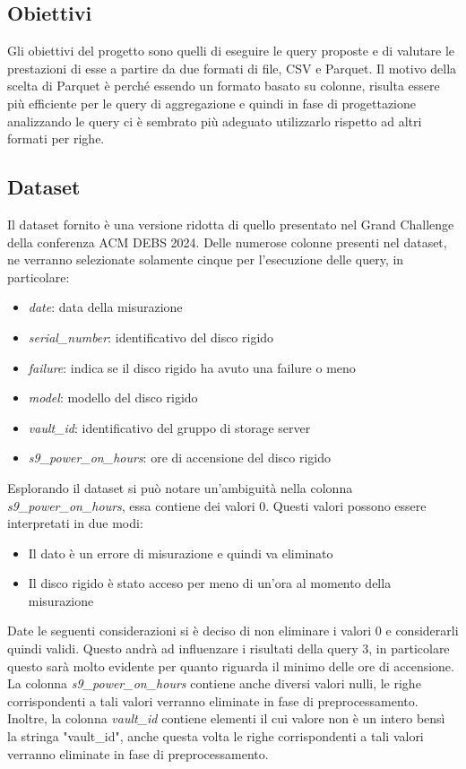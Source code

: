 \documentclass[conference]{IEEEtran}
\begin{document}
\subsection{Obiettivi}
Gli obiettivi del progetto sono quelli di eseguire le query proposte e di valutare le prestazioni di esse a partire da due formati di file, CSV e Parquet. Il motivo della scelta di Parquet è perché essendo un formato basato su colonne, risulta essere più efficiente per le query di aggregazione e quindi in fase di progettazione analizzando le query ci è sembrato più adeguato utilizzarlo rispetto ad altri formati per righe.

\subsection{Dataset}
Il dataset fornito è una versione ridotta di quello presentato nel Grand Challenge della conferenza ACM DEBS 2024. Delle numerose colonne presenti nel dataset, ne verranno selezionate solamente cinque per l'esecuzione delle query, in particolare:
\begin{itemize}
    \item \textit{date}: data della misurazione
    \item \textit{serial\_number}: identificativo del disco rigido
    \item \textit{failure}: indica se il disco rigido ha avuto una failure o meno
    \item \textit{model}: modello del disco rigido
    \item \textit{vault\_id}: identificativo del gruppo di storage server
    \item \textit{s9\_power\_on\_hours}: ore di accensione del disco rigido
\end{itemize}
Esplorando il dataset si può notare un'ambiguità nella colonna \textit{s9\_power\_on\_hours}, essa contiene dei valori 0. Questi valori possono essere interpretati in due modi:
\begin{itemize}
    \item Il dato è un errore di misurazione e quindi va eliminato
    \item Il disco rigido è stato acceso per meno di un'ora al momento della misurazione
\end{itemize}
Date le seguenti considerazioni si è deciso di non eliminare i valori 0 e considerarli quindi validi. Questo andrà ad influenzare i risultati della query 3, in particolare questo sarà molto evidente per quanto riguarda il minimo delle ore di accensione.
La colonna \textit{s9\_power\_on\_hours} contiene anche diversi valori nulli, le righe corrispondenti a tali valori verranno eliminate in fase di preprocessamento.
Inoltre, la colonna \textit{vault\_id} contiene elementi il cui valore non è un intero bensì la stringa "vault\_id", anche questa volta le righe corrispondenti a tali valori verranno eliminate in fase di preprocessamento.
\end{document}
